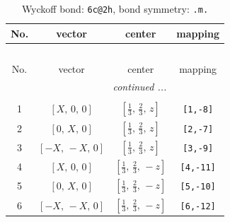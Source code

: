 \documentclass[fleqn,8pt]{jsarticle}
\begin{document}
\renewcommand{\arraystretch}{1.2}
\begin{longtable}{cccc}
\caption{Wyckoff bond: {\tt 6c@2h}, bond symmetry: {\tt .m.}}
 \\
 \hline \hline
No. & vector & center & mapping \\ \hline \endfirsthead

\multicolumn{3}{l}{\tablename\ \thetable{}} \\
 \hline \hline
No. & vector & center & mapping \\ \hline \endhead

 \hline \hline
\multicolumn{3}{r}{\footnotesize\it continued ...} \\ \endfoot

 \hline \hline
\multicolumn{3}{r}{} \\ \endlastfoot

1 & $\left[ X,\, 0,\, 0 \right]$ & $\left[ \frac{1}{3},\, \frac{2}{3},\, z \right]$ & {\tt [1,-8]} \\ \hline
2 & $\left[ 0,\, X,\, 0 \right]$ & $\left[ \frac{1}{3},\, \frac{2}{3},\, z \right]$ & {\tt [2,-7]} \\ \hline
3 & $\left[ - X,\, - X,\, 0 \right]$ & $\left[ \frac{1}{3},\, \frac{2}{3},\, z \right]$ & {\tt [3,-9]} \\ \hline
4 & $\left[ X,\, 0,\, 0 \right]$ & $\left[ \frac{1}{3},\, \frac{2}{3},\, - z \right]$ & {\tt [4,-11]} \\ \hline
5 & $\left[ 0,\, X,\, 0 \right]$ & $\left[ \frac{1}{3},\, \frac{2}{3},\, - z \right]$ & {\tt [5,-10]} \\ \hline
6 & $\left[ - X,\, - X,\, 0 \right]$ & $\left[ \frac{1}{3},\, \frac{2}{3},\, - z \right]$ & {\tt [6,-12]} \\
\end{longtable}
\renewcommand{\arraystretch}{1.2}
\end{document}
